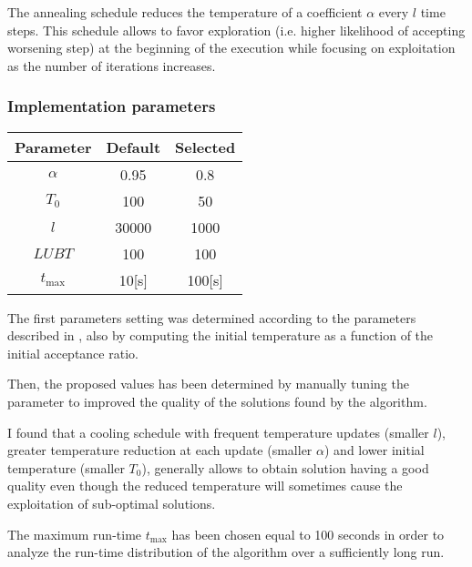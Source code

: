 \begin{homeworkProblem}
The annealing schedule reduces the temperature of a coefficient $\alpha$ every $l$ time steps. 
This schedule allows to favor exploration (i.e. higher likelihood of accepting worsening step) at the beginning of the execution while focusing on exploitation as the number of iterations increases.

\subsubsection{Implementation parameters}
\begin{center}
\begin{tabular}{|c|c|c|}
\hline
\textbf{Parameter} & \textbf{Default} & \textbf{Selected} \\ \hline 
$\alpha$ & 0.95 & 0.8 \\\hline 
$T_0$ & 100 & 50 \\ \hline 
$l$ & 30000 & 1000 \\ \hline 
$LUBT$ & 100 & 100 \\ \hline 
$t_{\max}$ & 10[s] & 100[s] \\
\hline
\end{tabular}
\label{saParameters}
\end{center}

The first parameters setting was determined according to the parameters described in \cite{ohlmann2007compressed}, also by computing the initial temperature as a function of the initial acceptance ratio.

Then, the proposed values has been determined by manually tuning the parameter to improved the quality of the solutions found by the algorithm.

I found that a cooling schedule with frequent temperature updates (smaller $l$), greater temperature reduction at each update (smaller $\alpha$) and lower initial temperature (smaller $T_0$), generally allows to obtain solution having a good quality even though the reduced temperature will sometimes cause the exploitation of sub-optimal solutions.

The maximum run-time $t_{\max}$ has been chosen equal to 100 seconds in order to analyze the run-time distribution of the algorithm over a sufficiently long run.
 
\end{homeworkProblem}		
